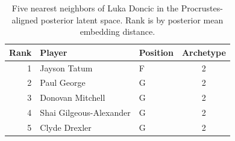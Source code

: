 \begin{table}[htbp]
  \centering\small
  \begin{tabular}{rllc}
    \toprule
    Rank & Player & Position & Archetype \\
    \midrule
    1 & Jayson Tatum & F & 2 \\
    2 & Paul George & G & 2 \\
    3 & Donovan Mitchell & G & 2 \\
    4 & Shai Gilgeous-Alexander & G & 2 \\
    5 & Clyde Drexler & G & 2 \\
    \bottomrule
  \end{tabular}
  \caption{Five nearest neighbors of Luka Doncic in the Procrustes-aligned posterior latent space. Rank is by posterior mean embedding distance.}
\end{table}

